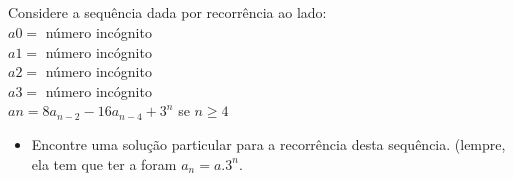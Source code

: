 \documentclass[]{article}
\begin{document}
		\subsection{}Considere a sequência dada por recorrência ao lado:\\
		$a0 = $ número incógnito\\
		$a1 = $ número incógnito\\
		$a2 = $ número incógnito\\
		$a3 = $ número incógnito\\
		$an = 8a_{n-2} - 16a_{n-4}+3^n$ se $n \geq 4$\\
		\begin{itemize}
			\item Encontre uma solução particular para a recorrência desta sequência. (lempre, ela tem que ter a foram $a_n = a.3^n$.
		\end{itemize}
\end{document}
